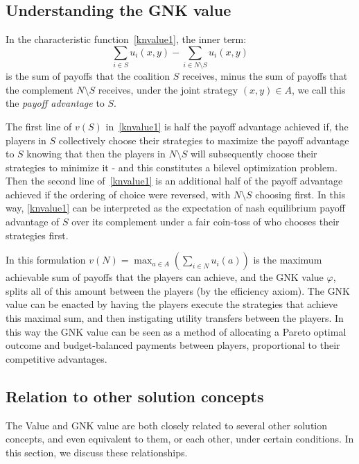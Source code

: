 \subsection{Understanding the GNK value}\label{the_value_def4}

In the characteristic function~\eqref{knvalue1}, the inner term:
\[
\sum_{i\in S} u_i(x,y) - \sum_{i\in N\setminus S} u_i(x,y)
\] 
is the sum of payoffs that the coalition $S$ receives, 
minus the sum of payoffs that the complement $N\setminus S$ receives, 
under the joint strategy $(x,y)\in A$, we call this the \textit{payoff advantage} to $S$.

The first line of $v(S)$ in~\eqref{knvalue1} is half the payoff advantage achieved if, the players in $S$ collectively choose their strategies to maximize the payoff advantage to $S$ knowing that then the players in $N\setminus S$ will subsequently choose their strategies to minimize it - and this constitutes a bilevel optimization problem.
Then the second line of~\eqref{knvalue1} is an additional half of the payoff advantage achieved if the ordering of choice were reversed, with $N\setminus S$ choosing first.
In this way, \eqref{knvalue1} can be interpreted as the expectation of nash equilibrium payoff advantage of $S$ over its complement under a fair coin-toss of who chooses their strategies first.

In this formulation $v(N) = \max_{a\in A} (\sum_{i\in N} u_i(a))$ is the maximum achievable sum of payoffs that the players can achieve, and the GNK value $\varphi$, splits all of this amount between the players (by the efficiency axiom).
The GNK value can be enacted by having the players execute the strategies that achieve this maximal sum, and then instigating utility transfers between the players.
In this way the GNK value can be seen as a method of allocating a Pareto optimal outcome and budget-balanced payments between players, proportional to their competitive advantages.

\subsection{Relation to other solution concepts}\label{relating_to_the_old}

The Value and GNK value are both closely related to several other solution concepts, and even equivalent to them, or each other, under certain conditions. In this section, we discuss these relationships.

